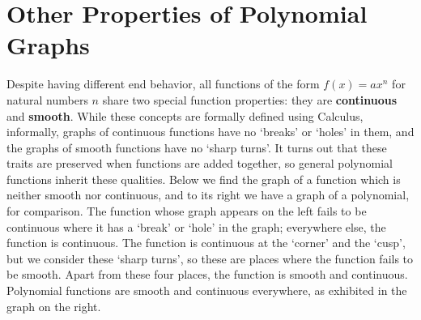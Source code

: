 \documentclass{ximera}
\begin{document}
\section{Other Properties of Polynomial Graphs}

Despite having different end behavior, all functions of the form $f(x) = ax^{n}$ for natural numbers $n$ share two special function properties:  they  are \textbf{continuous} and \textbf{smooth}.  While these concepts are formally defined using Calculus, informally, graphs of continuous functions have no `breaks' or `holes' in them, and the graphs of smooth functions have no `sharp turns'.  It turns out that these traits are preserved when functions are added together, so general polynomial functions inherit these qualities.  Below we find the graph of a function which is neither smooth nor continuous, and to its right we have a graph of a polynomial, for comparison.  The function whose graph appears on the left fails to be continuous where it has a `break' or `hole' in the graph;  everywhere else, the function is continuous.  The function is continuous at the `corner' and the `cusp', but we consider these `sharp turns', so these are places where the function fails to be smooth.  Apart from these four places, the function is smooth and continuous.  Polynomial functions are smooth and continuous everywhere, as exhibited in the graph on the right.
\end{document}

